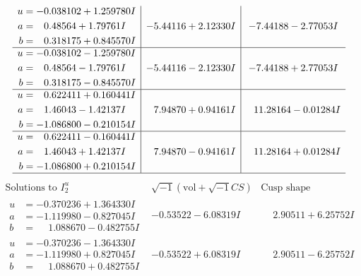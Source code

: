 \documentclass[1p]{elsarticle_modified}
\theoremstyle{definition}
\newcommand{\I}{\sqrt{-1}}
\begin{document}
$$\begin{array}{c|c|c}
\begin{aligned}
u &= -0.038102 + 1.259780 I \\
a &= \phantom{-}0.48564 + 1.79761 I \\
b &= \phantom{-}0.318175 + 0.845570 I\end{aligned}
 & -5.44116 + 2.12330 I & -7.44188 - 2.77053 I \\ \hline\begin{aligned}
u &= -0.038102 - 1.259780 I \\
a &= \phantom{-}0.48564 - 1.79761 I \\
b &= \phantom{-}0.318175 - 0.845570 I\end{aligned}
 & -5.44116 - 2.12330 I & -7.44188 + 2.77053 I \\ \hline\begin{aligned}
u &= \phantom{-}0.622411 + 0.160441 I \\
a &= \phantom{-}1.46043 - 1.42137 I \\
b &= -1.086800 - 0.210154 I\end{aligned}
 & \phantom{-}7.94870 + 0.94161 I & \phantom{-}11.28164 - 0.01284 I \\ \hline\begin{aligned}
u &= \phantom{-}0.622411 - 0.160441 I \\
a &= \phantom{-}1.46043 + 1.42137 I \\
b &= -1.086800 + 0.210154 I\end{aligned}
 & \phantom{-}7.94870 - 0.94161 I & \phantom{-}11.28164 + 0.01284 I\\
 \hline 
 \end{array}$$\newpage$$\begin{array}{c|c|c}  
\text{Solutions to }I^u_{2}& \I (\text{vol} + \sqrt{-1}CS) & \text{Cusp shape}\\
 \hline 
\begin{aligned}
u &= -0.370236 + 1.364330 I \\
a &= -1.119980 - 0.827045 I \\
b &= \phantom{-}1.088670 - 0.482755 I\end{aligned}
 & -0.53522 - 6.08319 I & \phantom{-}2.90511 + 6.25752 I \\ \hline\begin{aligned}
u &= -0.370236 - 1.364330 I \\
a &= -1.119980 + 0.827045 I \\
b &= \phantom{-}1.088670 + 0.482755 I\end{aligned}
 & -0.53522 + 6.08319 I & \phantom{-}2.90511 - 6.25752 I \\ \hline\begin{aligned}

\end{aligned}
\end{array}$$
\end{document}
